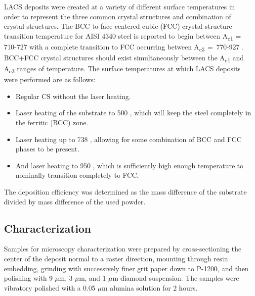 LACS deposits were created at a variety of different surface temperatures in order to represent the three common crystal structures and combination of crystal structures. The BCC to face-centered cubic (FCC) crystal structure transition temperature for AISI 4340 steel is reported to begin between A\textsubscript{c1} = 710-727 \celsius{} with a complete transition to FCC occurring between A\textsubscript{c3 }= 770-927 \celsius{} \cite{RN3376,RN3377,RN3379,RN3380,RN3382}. BCC+FCC crystal structures should exist simultaneously between the A\textsubscript{c1} and A\textsubscript{c3} ranges of temperature. The surface temperatures at which LACS deposits were performed are as follows: 


\begin{itemize}
	\item Regular CS without the laser heating. \par
	
	\item Laser heating of the substrate to 500 \celsius{}, which will keep the steel completely in the ferritic (BCC) zone.\par
	
	\item Laser heating up to 738 \celsius{}, allowing for some combination of BCC and FCC phases to be present.\par
	
	\item And laser heating to 950 \celsius{}, which is sufficiently high enough temperature to nominally transition completely to FCC.
\end{itemize}\par


The deposition efficiency was determined as the mass difference of the substrate divided by mass difference of the used powder.


\subsection*{Characterization}


Samples for microscopy characterization were prepared by cross-sectioning the center of the deposit normal to a raster direction, mounting through resin embedding, grinding with successively finer grit paper down to P-1200, and then polishing with 9 $ \mu $m, 3 $ \mu $m, and 1 $ \mu $m diamond suspension. The samples were vibratory polished with a 0.05 $ \mu $m alumina solution for 2 hours.

